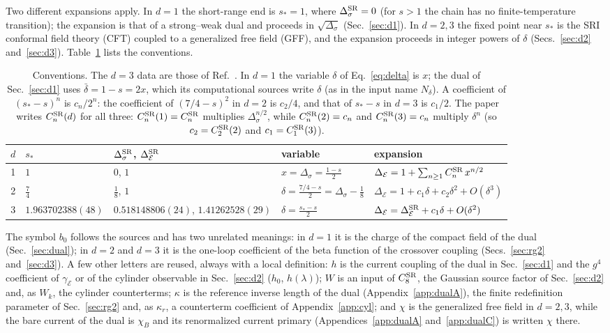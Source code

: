 \documentclass[11pt,a4paper]{article}
\numberwithin{equation}{section}
\newcommand{\De}{\Delta_{\mathcal E}}
\newcommand{\Ds}{\Delta_\sigma}
\newcommand{\CSR}{C^{\rm SR}}
\newcommand{\db}{\bar\delta}
\begin{document}
Two different expansions apply. In $d=1$ the short-range end is $s_*=1$, where $\Ds^{\rm SR}=0$ (for $s>1$ the chain
has no finite-temperature transition); the expansion is that of a strong--weak dual and proceeds in $\sqrt{\Ds}$
(Sec.~\ref{sec:d1}). In $d=2,3$ the fixed point near $s_*$ is the SRI conformal field theory (CFT) coupled to a
generalized free field (GFF), and the expansion proceeds in integer powers of $\delta$
(Secs.~\ref{sec:d2} and~\ref{sec:d3}). Table~\ref{tab:conv} lists the conventions.

\begin{table}[htbp]\centering\small
\renewcommand{\arraystretch}{1.25}\setlength{\tabcolsep}{4pt}
\begin{tabular}{@{}cllll@{}}
\toprule
$d$ & $s_*$ & $\Ds^{\rm SR}$, $\De^{\rm SR}$ & variable & expansion\\
\midrule
1 & $1$ & $0$, $1$ & $x=\Ds=\frac{1-s}{2}$ & $\De=1+\sum_{n\ge1}\CSR_n\,x^{n/2}$\\
2 & $\frac74$ & $\frac18$, $1$ & $\delta=\frac{7/4-s}{2}=\Ds-\frac18$ & $\De=1+c_1\delta+c_2\delta^2+O(\delta^3)$\\
3 & $1.963702388(48)$ & $0.518148806(24)$, $1.41262528(29)$ & $\delta=\frac{s_*-s}{2}$ & $\De=\De^{\rm SR}+c_1\delta+O(\delta^2)$\\
\bottomrule
\end{tabular}
\caption{Conventions. The $d=3$ data are those of Ref.~\cite{Chang:2024whx}. In $d=1$ the variable $\delta$ of
Eq.~\eqref{eq:delta} is $x$; the dual of Sec.~\ref{sec:d1} uses $\db=1-s=2x$, which its computational sources write
$\delta$ (as in the input name $N_\delta$). A coefficient of $(s_*-s)^n$ is $c_n/2^n$: the coefficient of $(7/4-s)^2$ in
$d=2$ is $c_2/4$, and that of $s_*-s$ in $d=3$ is $c_1/2$. The paper writes $C^{\rm SR}_n(d)$ for all three:
$C^{\rm SR}_n(1)=\CSR_n$ multiplies $\Ds^{n/2}$, while $C^{\rm SR}_n(2)=c_n$ and $C^{\rm SR}_n(3)=c_n$ multiply
$\delta^n$ (so $c_2=C^{\rm SR}_2(2)$ and $c_1=C^{\rm SR}_1(3)$).}
\label{tab:conv}
\end{table}

The symbol $b_0$ follows the sources and has two unrelated meanings: in $d=1$ it is the charge of the compact field of
the dual (Sec.~\ref{sec:dual}); in $d=2$ and $d=3$ it is the one-loop coefficient of the beta function of the
crossover coupling (Secs.~\ref{sec:rg2} and~\ref{sec:d3}). A few other letters are reused, always with a local
definition: $h$ is the current coupling of the dual in Sec.~\ref{sec:d1} and the $g^4$ coefficient of
$\gamma_{\mathcal E}$ or of the cylinder observable in Sec.~\ref{sec:d2} ($h_0$, $h(\lambda)$); $W$ is an input of
$\CSR_8$, the Gaussian source factor of Sec.~\ref{sec:d2} and, as $W_k$, the cylinder counterterms; $\kappa$ is the
reference inverse length of the dual (Appendix~\ref{app:dualA}), the finite redefinition parameter of
Sec.~\ref{sec:rg2} and, as $\kappa_r$, a counterterm coefficient of Appendix~\ref{app:cyl}; and $\chi$ is the
generalized free field in $d=2,3$, while the bare current of the dual is $\chi_B$ and its renormalized current primary
(Appendices~\ref{app:dualA} and~\ref{app:dualC}) is written $\chi$ there.
\end{document}
